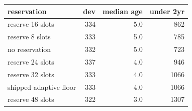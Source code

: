 \begin{tabular}{lrrr}
\toprule
reservation & dev & median age & under 2yr \\
\midrule
reserve 16 slots & 334 & 5.0 & 862 \\
reserve 8 slots & 333 & 5.0 & 785 \\
no reservation & 332 & 5.0 & 723 \\
reserve 24 slots & 337 & 4.0 & 946 \\
reserve 32 slots & 333 & 4.0 & 1066 \\
shipped adaptive floor & 333 & 4.0 & 1066 \\
reserve 48 slots & 322 & 3.0 & 1307 \\
\bottomrule
\end{tabular}
